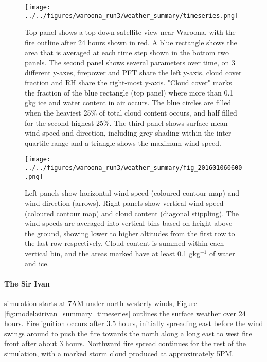     \begin{figure}
      \texttt{[image: ../../figures/waroona\_run3/weather\_summary/timeseries.png]}
      \caption{%
        Top panel shows a top down satellite view near Waroona, with the fire outline after 24 hours shown in red. A blue rectangle shows the area that is averaged at each time step shown in the bottom two panels.
        The second panel shows several parameters over time, on 3 different y-axes, firepower and PFT share the left y-axis, cloud cover fraction and RH share the right-most y-axis.
        "Cloud cover" marks the fraction of the blue rectangle (top panel) where more than 0.1 g\/kg ice and water content in air occurs. 
        The blue circles are filled when the heaviest 25\% of total cloud content occurs, and half filled for the second highest 25\%.
        The third panel shows surface mean wind speed and direction, including grey shading within the inter-quartile range and a triangle shows the maximum wind speed.
        }
      \label{fig:model:waroona_summary_timeseries}
    \end{figure}
    
    \begin{figure}
      \texttt{[image: ../../figures/waroona\_run3/weather\_summary/fig\_201601060600.png]}
      \caption{Left panels show horizontal wind speed (coloured contour map) and wind direction (arrows).
      Right panels show vertical wind speed (coloured contour map) and cloud content (diagonal stippling).
      The wind speeds are averaged into vertical bins based on height above the ground, showing lower to higher altitudes from the first row to the last row respectively.
      Cloud content is summed within each vertical bin, and the areas marked have at least 0.1 gkg$^{-1}$ of water and ice.}
      \label{fig:model:weather_summary_updraught}
    \end{figure}
    
    \paragraph{The Sir Ivan} simulation starts at 7AM under north westerly winds, Figure \ref{fig:model:sirivan_summary_timeseries} outlines the surface weather over 24 hours.
    Fire ignition occurs after 3.5 hours, initially spreading east before the wind swings around to push the fire towards the north along a long east to west fire front after about 3 hours. 
    Northward fire spread continues for the rest of the simulation, with a marked storm cloud produced at approximately 5PM.
    
